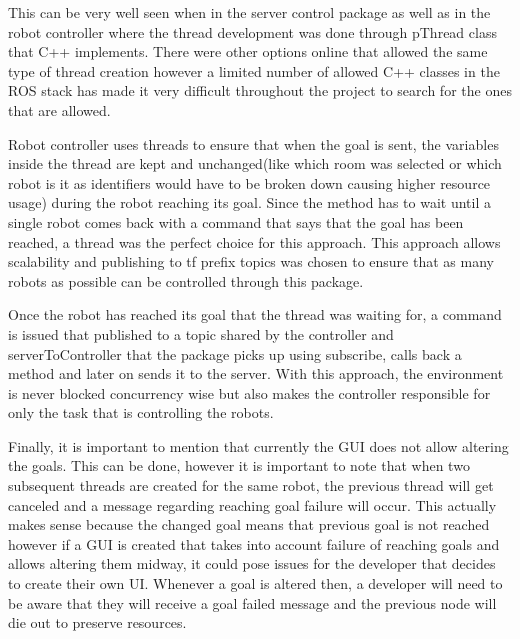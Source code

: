       This can be very well seen when in the server control package as well as in the robot controller where the thread development was done through pThread class that C++ implements. There were other options online that allowed the same type of thread creation however a limited number of allowed C++ classes in the ROS stack has made it very difficult throughout the project to search for the ones that are allowed.

      Robot controller uses threads to ensure that when the goal is sent, the variables inside the thread are kept and unchanged(like which room was selected or which robot is it as identifiers would have to be broken down causing higher resource usage) during the robot reaching its goal. Since the method has to wait until a single robot comes back with a command that says that the goal has been reached, a thread was the perfect choice for this approach. This approach allows scalability and publishing to tf prefix topics was chosen to ensure that as many robots as possible can be controlled through this package.

      Once the robot has reached its goal that the thread was waiting for, a command is issued that published to a topic shared by the controller and serverToController that the package picks up using subscribe, calls back a method and later on sends it to the server. With this approach, the environment is never blocked concurrency wise but also makes the controller responsible for only the task that is controlling the robots.

      Finally, it is important to mention that currently the GUI does not allow altering the goals. This can be done, however it is important to note that when two subsequent threads are created for the same robot, the previous thread will get canceled and a message regarding reaching goal failure will occur. This actually makes sense because the changed goal means that previous goal is not reached however if a GUI is created that takes into account failure of reaching goals and allows altering them midway, it could pose issues for the developer that decides to create their own UI. Whenever a goal is altered then, a developer will need to be aware that they will receive a goal failed message and the previous node will die out to preserve resources.

